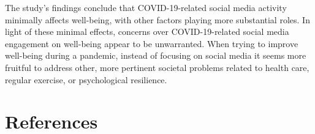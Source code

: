 \documentclass[
  man,mask,floatsintext]{apa7}
\begin{document}
The study's findings conclude that COVID-19-related social media activity minimally affects well-being, with other factors playing more substantial roles. In light of these minimal effects, concerns over COVID-19-related social media engagement on well-being appear to be unwarranted.
When trying to improve well-being during a pandemic, instead of focusing on social media it seems more fruitful to address other, more pertinent societal problems related to health care, regular exercise, or psychological resilience.

\newpage

\hypertarget{references}{%
\section{References}\label{references}}
\end{document}

